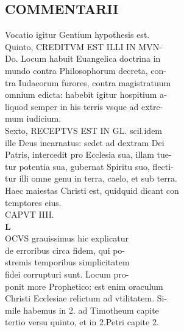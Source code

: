 \documentclass{article}
\begin{document}
\begin{pages}
\section*{COMMENTARII \\
                }Vocatio igitur Gentium hypothesis est. \\
                Quinto, CREDITVM EST ILLI IN MVN- \\
                Do. Locum habuit Euangelica doctrina in \\
                mundo contra Philosophorum decreta, con- \\
                tra Iudaeorum furores, contra magistratuum \\
                omnium edicta: habebit igitur hospitium a- \\
                liquod semper in his terris vsque ad extre- \\
                mum iudicium. \\
                Sexto, RECEPTVS EST IN GL. scil.idem \\
                ille Deus incarnatus: sedet ad dextram Dei \\
                Patris, intercedit pro Ecclesia sua, illam tue- \\
                tur potentia sua, gubernat Spiritu suo, flecti- \\
                tur illi omne genu in terra, caelo, et sub terra. \\
                Haec maiestas Christi est, quidquid dicant con \\
                temptores eius. \\
                CAPVT IIII. \\
                
\textbf{L \\
                }OCVS grauissimus hic explicatur \\
                de erroribus circa fidem, qui po- \\
                stremis temporibus simplicitatem \\
                fidei corrupturi sunt. Locum pro- \\
                ponit more Prophetico: est enim oraculum \\
                Christi Ecclesiae relictum ad vtilitatem. Si- \\
                mile habemus in 2. ad Timotheum capite \\
                tertio versu quinto, et in 2.Petri capite 2. \\
                

\end{pages}
\end{document}

